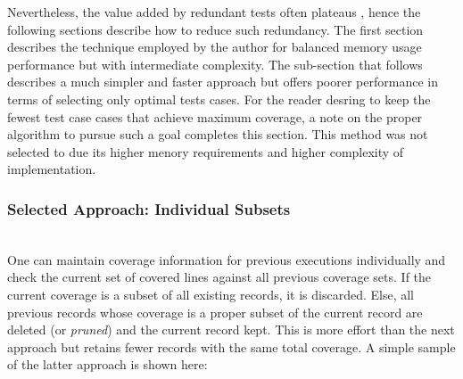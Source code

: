Nevertheless, the value added by redundant tests often plateaus 
\cite{lemieux2023codamosa}, hence the following sections
describe how to reduce such redundancy.  The first section describes
the technique employed by the author for balanced memory usage performance but
with intermediate complexity. The sub-section that follows describes a much simpler and faster
approach but offers poorer performance in terms of selecting only optimal tests 
cases.  For the reader desring to keep the fewest test case cases that achieve
maximum coverage, a note on the proper algorithm to pursue such a goal completes
 this section.  This method was not selected to due its
higher menory requirements and higher complexity of implementation.
 
\subsubsection{Selected Approach: Individual Subsets}\label{sec:tuning-2}
\hfill\\
One can maintain coverage information for previous
executions individually and check the current set of covered lines
against all previous coverage sets.  If the current coverage is
a subset of all existing records, it is discarded.  
Else, all previous records whose coverage is 
a proper subset of the current record are deleted (or \textit{pruned})
and the current record kept. This is more effort than the next approach but
retains fewer records with the same total coverage.  
A simple sample of the latter approach is shown here:

